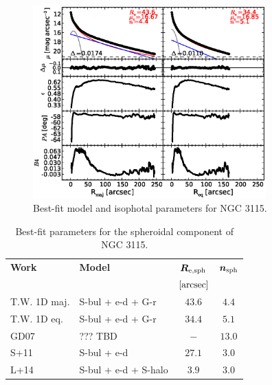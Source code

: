 \documentclass[preprint2]{emulateapj}
\newcommand{\fitfigurewidth}{0.8\textwidth}
\begin{document}
  \begin{figure}[h]
  \begin{center}
  \includegraphics[width=\fitfigurewidth]{images/n3115_1Dfit.eps}
  \caption{Best-fit model and isophotal parameters for NGC 3115.}
  \end{center}
  \end{figure}

  \begin{table}[h]
  \small
  \caption{Best-fit parameters for the spheroidal component of NGC 3115.}
  \begin{center}
  \begin{tabular}{llcc}
  \hline
  {\bf Work} & {\bf Model}   & $\bm R_{\rm e,sph}$    & $\bm n_{\rm sph}$ \\
    &  &  $[\rm arcsec]$ & \\
  \hline
  T.W. 1D maj. & S-bul + e-d + G-r & $43.6$  &  $4.4$ \\
  T.W. 1D eq.  & S-bul + e-d + G-r & $34.4$  &  $5.1$ \\
  \hline
  GD07         & ??? TBD	       & $-$	&  $13.0$ \\
  S+11         & S-bul + e-d	       & $27.1$ &  $3.0$ \\
  L+14         & S-bul + e-d + S-halo  & $3.9$  &  $3.0$ \\
  \hline
  \end{tabular}
  \end{center}
  \label{tab:n3115}
  \end{table}
    
\end{document}
